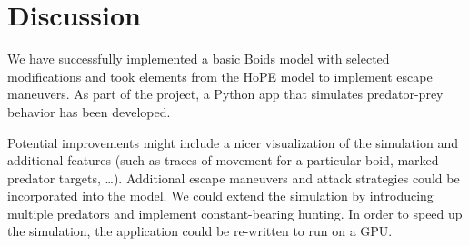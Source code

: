 \documentclass[9pt]{pnas-new}
\begin{document}
\pagebreak

\section*{Discussion}

We have successfully implemented a basic Boids model with selected modifications and took elements from
the HoPE model to implement escape maneuvers. As part of the project, a Python app that simulates
predator-prey behavior has been developed.

Potential improvements might include a nicer visualization of the simulation and additional features (such as
traces of movement for a particular boid, marked predator targets, \ldots). Additional escape maneuvers
and attack strategies could be incorporated into the model. We could extend the simulation by introducing multiple predators
and implement constant-bearing hunting. In order to speed up the simulation, the application could be re-written
to run on a GPU.


\showacknow %


\begin{multicols}{2}
    \section*{\bibname}
    
\end{multicols}
\end{document}
